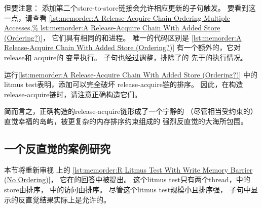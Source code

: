 \begin{listing}

\caption{排序多个访问的Release-Acquire链}
\label{lst:memorder:A Release-Acquire Chain Ordering Multiple Accesses}
\end{listing}

\begin{listing}

\caption{添加了Store的Release-Acquire链（有排序吗？）}
\label{lst:memorder:A Release-Acquire Chain With Added Store (Ordering?)}
\end{listing}

但要注意：
添加第二个store-to-store链接会允许相应更新的子句触发。
要看到这一点，请查看
\cref{lst:memorder:A Release-Acquire Chain Ordering Multiple Accesses,%
lst:memorder:A Release-Acquire Chain With Added Store (Ordering?)}，
它们具有相同的和进程。
唯一的代码区别是
\cref{lst:memorder:A Release-Acquire Chain With Added Store (Ordering?)}
有一个额外的，它对 release和 acquire的
变量执行。
子句也经过调整，排除了的
先于的执行情况。

运行\cref{lst:memorder:A Release-Acquire Chain With Added Store (Ordering?)}
中的litmus test表明，添加可以完全破坏
release-acquire链的排序。
因此，在构造release-acquire链时，请注意正确构造它们。

\QuickQuizEnd

简而言之，正确构造的release-acquire链形成了一个宁静的
（尽管相当受约束的）
直觉幸福的岛屿，被更复杂的内存排序约束组成的
强烈反直觉的大海所包围。

\subsection{一个反直觉的案例研究}
\label{sec:memorder:A Counter-Intuitive Case Study}

本节将重新审视
上的
\cref{lst:memorder:R Litmus Test With Write Memory Barrier (No Ordering)}，
它在\QuickQuizARef{\MemorderQQLitmusTestR}的回答中被提出。
这个litmus test只有两个thread，中的store由排序，
中的访问由排序。
尽管这个litmus test规模小且排序强，
子句中显示的反直觉结果实际上是允许的。

